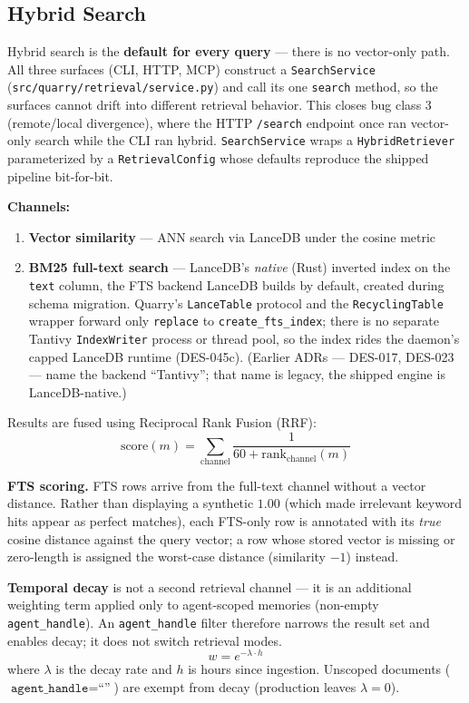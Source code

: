 \documentclass[a4paper,10pt]{article}
\newcommand{\modpath}[1]{\texttt{src/quarry/#1}}
\begin{document}
\subsection{Hybrid Search}

Hybrid search is the \textbf{default for every query} --- there is no
vector-only path.  All three surfaces (CLI, HTTP, MCP) construct a
\texttt{SearchService} (\modpath{retrieval/service.py}) and call its one
\texttt{search} method, so the surfaces cannot drift into different
retrieval behavior.  This closes bug class 3 (remote/local divergence),
where the HTTP \texttt{/search} endpoint once ran vector-only search
while the CLI ran hybrid.  \texttt{SearchService} wraps a
\texttt{HybridRetriever} parameterized by a \texttt{RetrievalConfig}
whose defaults reproduce the shipped pipeline bit-for-bit.

\textbf{Channels:}
\begin{enumerate}
  \item \textbf{Vector similarity} --- ANN search via LanceDB under the
    cosine metric
  \item \textbf{BM25 full-text search} --- LanceDB's \emph{native}
    (Rust) inverted index on the \texttt{text} column, the FTS backend
    LanceDB builds by default, created during schema migration.  Quarry's
    \texttt{LanceTable} protocol and the \texttt{RecyclingTable} wrapper
    forward only \texttt{replace} to \texttt{create\_fts\_index}; there is
    no separate Tantivy \texttt{IndexWriter} process or thread pool, so the
    index rides the daemon's capped LanceDB runtime (DES-045c).  (Earlier
    ADRs --- DES-017, DES-023 --- name the backend ``Tantivy''; that name is
    legacy, the shipped engine is LanceDB-native.)
\end{enumerate}

Results are fused using Reciprocal Rank Fusion (RRF):
\[
  \text{score}(m) = \sum_{\text{channel}} \frac{1}{60 + \text{rank}_{\text{channel}}(m)}
\]

\textbf{FTS scoring.}  FTS rows arrive from the full-text channel without
a vector distance.  Rather than displaying a synthetic $1.00$ (which made
irrelevant keyword hits appear as perfect matches), each FTS-only row is
annotated with its \emph{true} cosine distance against the query vector;
a row whose stored vector is missing or zero-length is assigned the
worst-case distance (similarity $-1$) instead.

\textbf{Temporal decay} is not a second retrieval channel --- it is an
additional weighting term applied only to agent-scoped memories (non-empty
\texttt{agent\_handle}).  An \texttt{agent\_handle} filter therefore
narrows the result set and enables decay; it does not switch retrieval
modes.
\[
  w = e^{-\lambda \cdot h}
\]
where $\lambda$ is the decay rate and $h$ is hours since ingestion.
Unscoped documents ($\texttt{agent\_handle} = \text{``''}$) are exempt
from decay (production leaves $\lambda = 0$).
\end{document}
